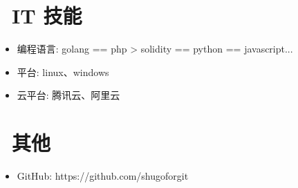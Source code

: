 \documentclass{resume}
\begin{document}

\section{\faCogs\ IT 技能}
\begin{itemize}[parsep=0.5ex]
  \item 编程语言: golang == php > solidity == python == javascript... 
  \item 平台: linux、windows
  \item 云平台: 腾讯云、阿里云
\end{itemize}

\section{\faInfo\ 其他}
\begin{itemize}[parsep=0.5ex]
  \item GitHub: https://github.com/shugoforgit
\end{itemize}

%
%
\end{document}
